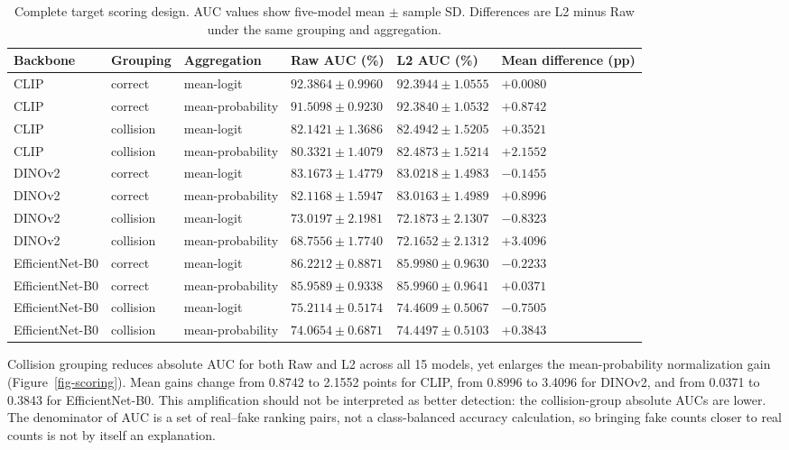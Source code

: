 \documentclass{ieeeaccess}
\begin{document}
\begin{table}[t]
\centering
\caption{Complete target scoring design. AUC values show five-model mean $\pm$ sample SD. Differences are L2 minus Raw under the same grouping and aggregation.}
\label{tab:scoring}
\setlength{\tabcolsep}{5pt}
\footnotesize
\begin{tabular}{llllll}
\toprule
Backbone & Grouping & Aggregation & Raw AUC (\%) & L2 AUC (\%) & Mean difference (pp) \\
\midrule
CLIP & correct & mean-logit & $92.3864\pm0.9960$ & $92.3944\pm1.0555$ & $+0.0080$ \\
CLIP & correct & mean-probability & $91.5098\pm0.9230$ & $92.3840\pm1.0532$ & $+0.8742$ \\
CLIP & collision & mean-logit & $82.1421\pm1.3686$ & $82.4942\pm1.5205$ & $+0.3521$ \\
CLIP & collision & mean-probability & $80.3321\pm1.4079$ & $82.4873\pm1.5214$ & $+2.1552$ \\
DINOv2 & correct & mean-logit & $83.1673\pm1.4779$ & $83.0218\pm1.4983$ & $-0.1455$ \\
DINOv2 & correct & mean-probability & $82.1168\pm1.5947$ & $83.0163\pm1.4989$ & $+0.8996$ \\
DINOv2 & collision & mean-logit & $73.0197\pm2.1981$ & $72.1873\pm2.1307$ & $-0.8323$ \\
DINOv2 & collision & mean-probability & $68.7556\pm1.7740$ & $72.1652\pm2.1312$ & $+3.4096$ \\
EfficientNet-B0 & correct & mean-logit & $86.2212\pm0.8871$ & $85.9980\pm0.9630$ & $-0.2233$ \\
EfficientNet-B0 & correct & mean-probability & $85.9589\pm0.9338$ & $85.9960\pm0.9641$ & $+0.0371$ \\
EfficientNet-B0 & collision & mean-logit & $75.2114\pm0.5174$ & $74.4609\pm0.5067$ & $-0.7505$ \\
EfficientNet-B0 & collision & mean-probability & $74.0654\pm0.6871$ & $74.4497\pm0.5103$ & $+0.3843$ \\
\bottomrule
\end{tabular}
\end{table}

Collision grouping reduces absolute AUC for both Raw and L2 across all
15 models, yet enlarges the mean-probability normalization gain
(Figure~\ref{fig-scoring}). Mean gains change from 0.8742 to 2.1552
points for CLIP, from 0.8996 to 3.4096 for DINOv2, and from 0.0371 to
0.3843 for EfficientNet-B0. This amplification should not be interpreted
as better detection: the collision-group absolute AUCs are lower. The
denominator of AUC is a set of real--fake ranking pairs, not a
class-balanced accuracy calculation, so bringing fake counts closer to
real counts is not by itself an explanation.
\end{document}
